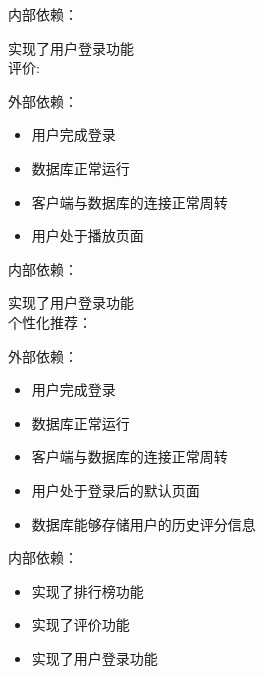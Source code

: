    
  
    内部依赖：
    
    实现了用户登录功能\\
  
   评价:
  
   
  
    外部依赖：
    
    \begin{itemize}
    
    
    
        \item 用户完成登录
    
        \item 数据库正常运行
    
        \item 客户端与数据库的连接正常周转
    
        \item 用户处于播放页面
    
    \end{itemize}
  
   
    
    内部依赖：
    
    实现了用户登录功能\\
  
   个性化推荐：
  
   
    
    外部依赖：
    
    \begin{itemize}
    
    
    
        \item 用户完成登录
    
        \item 数据库正常运行
    
        \item 客户端与数据库的连接正常周转
    
        \item 用户处于登录后的默认页面
    
        \item 数据库能够存储用户的历史评分信息
    
    \end{itemize}
    
        
    
    内部依赖：
    
        \begin{itemize}
    
        \item 实现了排行榜功能
    
        \item 实现了评价功能
    
        \item 实现了用户登录功能
    
    \end{itemize}


